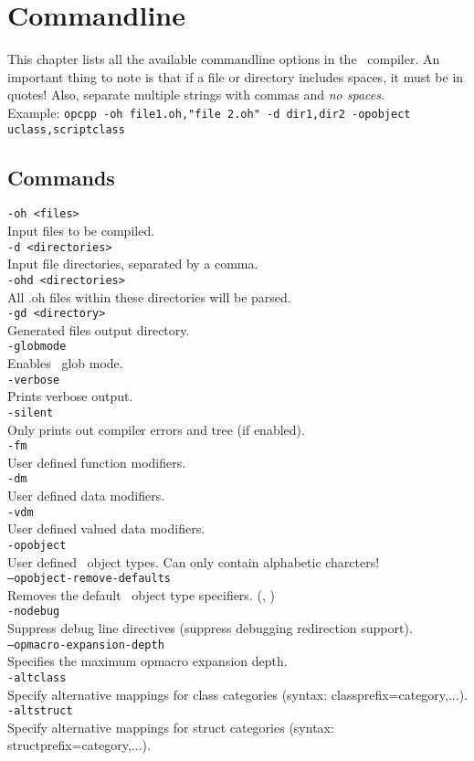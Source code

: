 
\newcommand{\cloption}[2]{{\tt #1} \\ \hspace*{4ex} #2 \\}

\chapter{Commandline}
\label{chap:commandline}

This chapter lists all the available commandline options in the \opCPP\ compiler.  An important thing to note is that if a file or directory includes spaces, it must be in quotes!  Also, separate multiple strings with commas and {\em no spaces}.\\

Example:  {\tt opcpp -oh file1.oh,"file 2.oh" -d dir1,dir2 -opobject uclass,scriptclass}

\section{Commands}

\cloption{-oh <files>}{Input files to be compiled.}

\cloption{-d <directories>}{Input file directories, separated by a comma.}

\cloption{-ohd <directories>}{All .oh files within these directories will be parsed.}

\cloption{-gd <directory>}{Generated files output directory.}

\cloption{-globmode}{Enables \opCPP\ glob mode.}

\cloption{-verbose}{Prints verbose output.}

\cloption{-silent}{Only prints out compiler errors and tree (if enabled).}

\cloption{-fm}{User defined function modifiers.}

\cloption{-dm}{User defined data modifiers.}

\cloption{-vdm}{User defined valued data modifiers.}

\cloption{-opobject}{User defined \opCPP\ object types.  Can only contain alphabetic charcters!}

\cloption{--opobject-remove-defaults}{Removes the default \opCPP\ object type specifiers. (\opcppK{opclass}, \opcppK{opstruct})}

\cloption{-nodebug}{Suppress debug line directives (suppress debugging redirection support).}

\cloption{--opmacro-expansion-depth}{Specifies the maximum opmacro expansion depth.}

\cloption{-altclass}{Specify alternative mappings for class categories (syntax: classprefix=category,...).}

\cloption{-altstruct}{Specify alternative mappings for struct categories (syntax: structprefix=category,...).}

